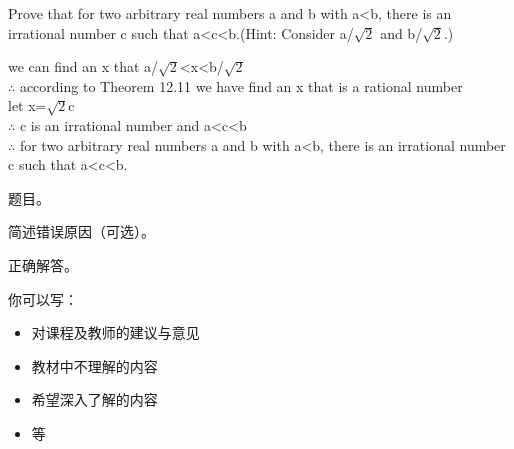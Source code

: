 \documentclass[11pt, a4paper, UTF8]{ctexart}
\begin{document}
\begin{problem}[UD:12.23]
Prove that for two arbitrary real numbers a and b with a<b, there is an irrational number c such that a<c<b.(Hint: Consider a/$\sqrt{2}$ and b/$\sqrt{2}$.)
\end{problem}
\begin{solution}
we can find an x that a/$\sqrt{2}$<x<b/$\sqrt{2}$\\
$\therefore$ according to Theorem 12.11 we have find an x that is a rational number\\
let x=$\sqrt{2}$c\\
$\therefore$ c is an irrational number and a<c<b\\
$\therefore$ for two arbitrary real numbers a and b with a<b, there is an irrational number c such that a<c<b.
  
\end{solution}







\begincorrection	%

\begin{problem}[题号]
  题目。
\end{problem}

\begin{cause}
  简述错误原因（可选）。
\end{cause}

\begin{revision}
  正确解答。
\end{revision}
\beginfb	%

你可以写：
\begin{itemize}
  \item 对课程及教师的建议与意见
  \item 教材中不理解的内容
  \item 希望深入了解的内容
  \item 等
\end{itemize}
\end{document}
